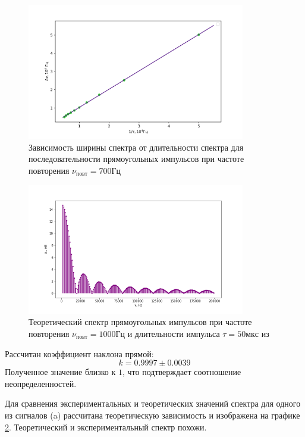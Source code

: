 \documentclass[a4paper,12pt]{article} %
\begin{document}
\begin{figure}[h!]
\begin{center}
\includegraphics[width=0.85\textwidth]{dnu(tau)}
\caption{Зависимость ширины спектра от длительности спектра для последовательности прямоугольных импульсов при частоте повторения $\nu_{повт} = 700 Гц$} \label{dnu(tau)_img}
\end{center}
\end{figure}
\begin{figure}[h!]
\begin{center}
\includegraphics[width=0.85\textwidth]{a(n)}
\caption{Теоретический спектр прямоугольных импульсов при частоте повторения $\nu_{повт} = 1000 Гц$ и длительности импульса $\tau = 50 мкс$ из \cite{labnik}} \label{теор}
\end{center}
\end{figure}
Рассчитан коэффициент наклона прямой:
\begin{equation}
k = 0.9997 \pm 0.0039
\end{equation}
Полученное значение близко к $1$, что подтверждает соотношение неопределенностей. 


Для сравнения экспериментальных и теоретических значений спектра для одного из сигналов (a) рассчитана теоретическую зависимость и изображена на графике \ref{теор}. Теоретический и экспериментальный спектр похожи.
\end{document}

